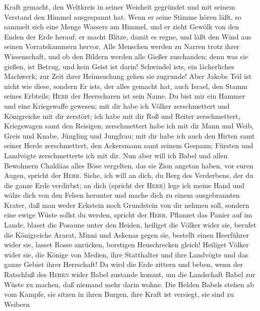 Kraft gemacht, den Weltkreis in seiner Weisheit gegründet und mit seinem
Verstand den Himmel ausgespannt hat.  Wenn er seine
Stimme hören läßt, so sammelt sich eine Menge Wassers am Himmel, und er
zieht Gewölk von den Enden der Erde herauf; er macht Blitze, damit es
regne, und läßt den Wind aus seinen Vorratskammern hervor.
 Alle Menschen werden zu Narren trotz ihrer Wissenschaft,
und ob den Bildern werden alle Gießer zuschanden; denn was sie gießen,
ist Betrug, und kein Geist ist darin!  Schwindel
ist\textquotesingle s, ein lächerliches Machwerk; zur Zeit ihrer
Heimsuchung gehen sie zugrunde!  Aber Jakobs Teil ist
nicht wie diese, sondern Er ist\textquotesingle s, der alles gemacht
hat, auch Israel, den Stamm seines Erbteils; \textsc{Herr} der
Heerscharen ist sein Name.  Du bist mir ein Hammer und
eine Kriegswaffe gewesen; mit dir habe ich Völker zerschmettert und
Königreiche mit dir zerstört;  ich habe mit dir Roß und
Reiter zerschmettert, Kriegswagen samt den Reisigen; 
zerschmettert habe ich mit dir Mann und Weib, Greis und Knabe, Jüngling
und Jungfrau;  mit dir habe ich auch den Hirten samt
seiner Herde zerschmettert, den Ackersmann samt seinem Gespann; Fürsten
und Landvögte zerschmetterte ich mit dir.  Nun aber will
ich Babel und allen Bewohnern Chaldäas alles Böse vergelten, das sie
Zion angetan haben, vor euren Augen, spricht der \textsc{Herr}.
 Siehe, ich will an dich, du Berg des Verderbens, der du
die ganze Erde verdirbst; an dich (spricht der \textsc{Herr}) lege ich
meine Hand und wälze dich von den Felsen herunter und mache dich zu
einem ausgebrannten Krater,  daß man weder Eckstein noch
Grundstein von dir nehmen soll, sondern eine ewige Wüste sollst du
werden, spricht der \textsc{Herr}.  Pflanzet das Panier
auf im Lande, blaset die Posaune unter den Heiden, heiliget die Völker
wider sie, berufet die Königreiche Ararat, Minni und Askenas gegen sie,
bestellt einen Heerführer wider sie, lasset Rosse anrücken, borstigen
Heuschrecken gleich!  Heiliget Völker wider sie, die
Könige von Medien, ihre Statthalter und ihre Landvögte und das ganze
Gebiet ihrer Herrschaft!  Da wird die Erde zittern und
beben, wenn der Ratschluß des \textsc{Herrn} wider Babel zustande kommt,
um die Landschaft Babel zur Wüste zu machen, daß niemand mehr darin
wohne.  Die Helden Babels stehen ab vom Kampfe, sie
sitzen in ihren Burgen, ihre Kraft ist versiegt, sie sind zu Weibern
